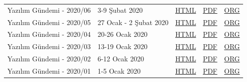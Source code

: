 \documentclass[11pt]{article}
\begin{document}
\begin{center}
\begin{tabular}{lllll}
Yazılım Gündemi - 2020/06 & 3-9 Şubat 2020 & \href{arsiv/2020/06/yazilim-gundemi-2020-06.html}{HTML} & \href{arsiv/2020/06/yazilim-gundemi-2020-06.pdf}{PDF} & \href{arsiv/2020/06/yazilim-gundemi-2020-06.pdf}{ORG}\\
Yazılım Gündemi - 2020/05 & 27 Ocak - 2 Şubat 2020 & \href{arsiv/2020/05/yazilim-gundemi-2020-05.html}{HTML} & \href{arsiv/2020/05/yazilim-gundemi-2020-05.pdf}{PDF} & \href{arsiv/2020/05/yazilim-gundemi-2020-05.pdf}{ORG}\\
Yazılım Gündemi - 2020/04 & 20-26 Ocak 2020 & \href{arsiv/2020/04/yazilim-gundemi-2020-04.html}{HTML} & \href{arsiv/2020/04/yazilim-gundemi-2020-04.pdf}{PDF} & \href{arsiv/2020/04/yazilim-gundemi-2020-04.pdf}{ORG}\\
Yazılım Gündemi - 2020/03 & 13-19 Ocak 2020 & \href{arsiv/2020/03/yazilim-gundemi-2020-03.html}{HTML} & \href{arsiv/2020/03/yazilim-gundemi-2020-03.pdf}{PDF} & \href{arsiv/2020/03/yazilim-gundemi-2020-03.pdf}{ORG}\\
Yazılım Gündemi - 2020/02 & 6-12 Ocak 2020 & \href{arsiv/2020/02/yazilim-gundemi-2020-02.html}{HTML} & \href{arsiv/2020/02/yazilim-gundemi-2020-02.pdf}{PDF} & \href{arsiv/2020/02/yazilim-gundemi-2020-02.pdf}{ORG}\\
Yazılım Gündemi - 2020/01 & 1-5 Ocak 2020 & \href{arsiv/2020/01/yazilim-gundemi-2020-01.html}{HTML} & \href{arsiv/2020/01/yazilim-gundemi-2020-01.pdf}{PDF} & \href{arsiv/2020/01/yazilim-gundemi-2020-01.pdf}{ORG}\\
\hline
\end{tabular}
\end{center}
\end{document}
